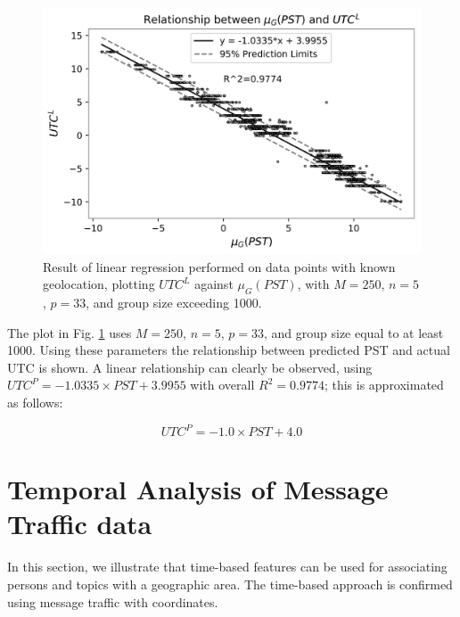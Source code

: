\begin{figure}[!t]
\centering
\includegraphics[width=5in]{Figures/filename.png}
\caption[Linear regression between UTC and min of time distribution]{Result of linear regression performed on data points with known geolocation, plotting $UTC^L$ against
$\mu_G({PST})$, with $M=250$, $n=5$, $p=33$, and group size exceeding 1000.}
\label{fig_3}
\end{figure} 

The plot in Fig. \ref{fig_3} uses $M=250$, $n=5$, $p=33$, and group size equal to at least 1000. Using these parameters the relationship between predicted PST %
and actual UTC is shown. A linear relationship can clearly be observed, using $UTC^P = -1.0335\times PST + 3.9955$
 with overall $R^2=0.9774$;
 this is approximated as follows:

\begin{equation}
UTC^P = -1.0 \times PST + 4.0
\label{eq001}
\end{equation}

\section{Temporal Analysis of Message Traffic data} \label{sec4}
\label{subsec-illustration}

In this section, we illustrate that time-based features can be used for associating persons and topics with a geographic area. The time-based approach is confirmed using message traffic with coordinates.


